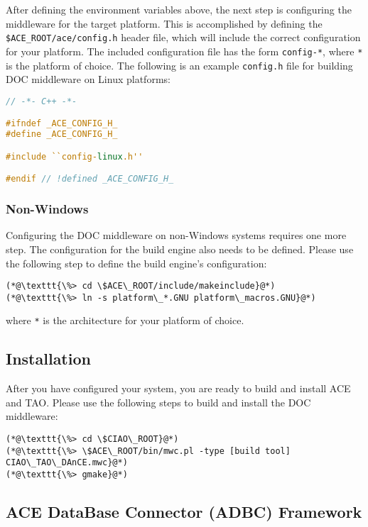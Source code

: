 After defining the environment variables above, the next step is 
configuring the middleware for the target platform. This is accomplished by 
defining the \texttt{\$ACE\_ROOT/ace/config.h} header file, which will include the correct 
configuration for your platform. The included configuration file has the 
form \texttt{config-*}, where \texttt{*} is the platform of choice.
The following is an example \texttt{config.h} file for building DOC middleware 
on Linux platforms:
\begin{lstlisting}[language=C++]
// -*- C++ -*-

#ifndef _ACE_CONFIG_H_
#define _ACE_CONFIG_H_

#include ``config-linux.h''

#endif // !defined _ACE_CONFIG_H_
\end{lstlisting}

\subsubsection{Non-Windows}
Configuring the DOC middleware on non-Windows systems requires one more 
step. The configuration for the build engine also needs to be defined. 
Please use the following step to define the build engine's configuration:
\begin{lstlisting}
(*@\texttt{\%> cd \$ACE\_ROOT/include/makeinclude}@*)
(*@\texttt{\%> ln -s platform\_*.GNU platform\_macros.GNU}@*)
\end{lstlisting}
where \texttt{*} is the architecture for your platform of choice.

\subsection{Installation}

After you have configured your system, you are ready to build and 
install ACE and TAO. Please use the following steps to build and 
install the DOC middleware:
\begin{lstlisting}
(*@\texttt{\%> cd \$CIAO\_ROOT}@*)
(*@\texttt{\%> \$ACE\_ROOT/bin/mwc.pl -type [build tool] CIAO\_TAO\_DAnCE.mwc}@*)
(*@\texttt{\%> gmake}@*)
\end{lstlisting}

\subsection{ACE DataBase Connector (ADBC) Framework}
\label{sec:thirdparty-adbc}

